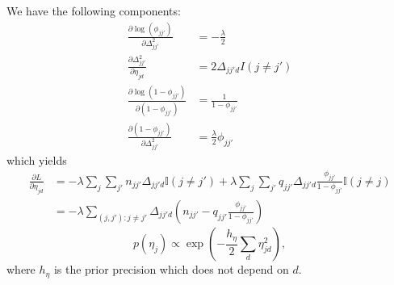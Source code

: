 We have the following components:
\begin{align*}
  \frac{\partial \log(\phi_{jj'})}{\partial \Delta_{jj'}^2} &=
  -\frac{\lambda}{2} \\
  \frac{\partial \Delta_{jj'}^2}{\partial \eta_{jd}} &= 2\Delta_{jj'd} I(j \neq j')\\
  \frac{\partial \log(1 - \phi_{jj'})}{\partial (1 -
    \phi_{jj'})} &= \frac{1}{1 - \phi_{jj'}} \\
  \frac{\partial (1 - \phi_{jj'})}{\partial
    \Delta_{jj'}^2} &= \frac{\lambda}{2} \phi_{jj'}
\end{align*}
which yields
\begin{align*}
  \frac{\partial L}{\partial \eta_{jd}} &= -\lambda \sum_{j}
  \sum_{j'} n_{jj'} \Delta_{jj'd} \mathbb{I}(j \neq j') +
  \lambda \sum_{j}\sum_{j'} q_{jj'} \Delta_{jj'd} \frac{\phi_{jj'}}{1 -
    \phi_{jj'}} \mathbb{I}(j \neq j) \\
  &= - \lambda \sum_{(j,j'): j \neq j'} \Delta_{jj'd} \left(n_{jj'} - q_{jj'}
    \frac{\phi_{jj'}}{1 - \phi_{jj'}}\right)
\end{align*}
\begin{equation*}
  p(\eta_j) \propto \exp\left(-\frac{h_\eta}{2} \sum_{d} \eta_{jd}^2 \right),
\end{equation*}
where $h_{\eta}$ is the prior precision which does not depend on $d$.





